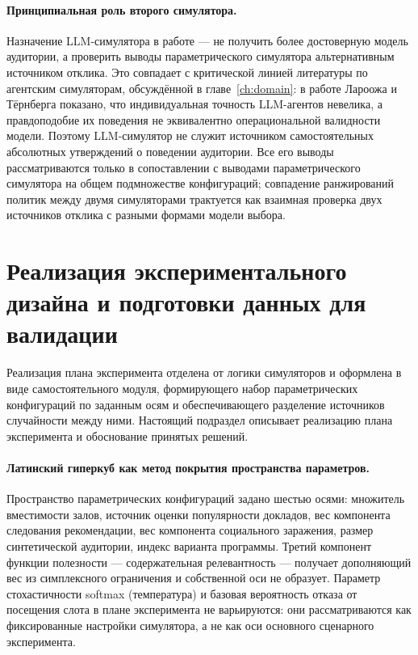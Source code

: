 \paragraph{Принципиальная роль второго симулятора.}
Назначение LLM-симулятора в работе --- не получить более достоверную модель аудитории, а проверить выводы параметрического симулятора альтернативным источником отклика. Это совпадает с критической линией литературы по агентским симуляторам, обсуждённой в главе~\ref{ch:domain}: в работе Лароожа и Тёрнберга показано, что индивидуальная точность LLM-агентов невелика, а правдоподобие их поведения не эквивалентно операциональной валидности модели. Поэтому LLM-симулятор не служит источником самостоятельных абсолютных утверждений о поведении аудитории. Все его выводы рассматриваются только в сопоставлении с выводами параметрического симулятора на общем подмножестве конфигураций; совпадение ранжирований политик между двумя симуляторами трактуется как взаимная проверка двух источников отклика с разными формами модели выбора.


\section{Реализация экспериментального дизайна и подготовки данных для валидации}
\label{sec:3-6}

Реализация плана эксперимента отделена от логики симуляторов и оформлена в виде самостоятельного модуля, формирующего набор параметрических конфигураций по заданным осям и обеспечивающего разделение источников случайности между ними. Настоящий подраздел описывает реализацию плана эксперимента и обоснование принятых решений.

\paragraph{Латинский гиперкуб как метод покрытия пространства параметров.}
Пространство параметрических конфигураций задано шестью осями: множитель вместимости залов, источник оценки популярности докладов, вес компонента следования рекомендации, вес компонента социального заражения, размер синтетической аудитории, индекс варианта программы. Третий компонент функции полезности --- содержательная релевантность --- получает дополняющий вес из симплексного ограничения и собственной оси не образует. Параметр стохастичности softmax (температура) и базовая вероятность отказа от посещения слота в плане эксперимента не варьируются: они рассматриваются как фиксированные настройки симулятора, а не как оси основного сценарного эксперимента.

